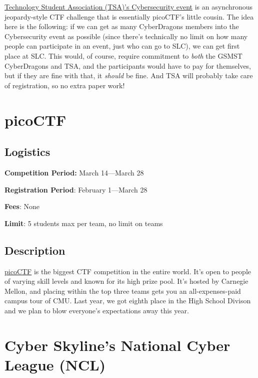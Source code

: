 \documentclass[
  letterpaper,
  DIV=11,
  numbers=noendperiod]{scrartcl}
\begin{document}
\href{https://docs.google.com/document/d/1q5fqitr-ezFVO6owV2g9lBzOqPFntbkny2nBKQRG9OU/edit?usp=sharing}{Technology
Student Association (TSA)'s Cybersecurity event} is an asynchronous
jeopardy-style CTF challenge that is essentially picoCTF's little
cousin. The idea here is the following: if we can get as many
CyberDragons members into the Cybersecurity event as possible (since
there's technically no limit on how many people can participate in an
event, just who can go to SLC), we can get first place at SLC. This
would, of course, require commitment to \emph{both} the GSMST
CyberDragons and TSA, and the participants would have to pay for
themselves, but if they are fine with that, it \emph{should} be fine.
And TSA will probably take care of registration, so no extra paper work!

\hypertarget{picoctf}{%
\section{picoCTF}\label{picoctf}}

\hypertarget{logistics-8}{%
\subsection{Logistics}\label{logistics-8}}

\textbf{Competition Period:} March 14---March 28

\textbf{Registration Period}: February 1---March 28

\textbf{Fees}: None

\textbf{Limit}: 5 students max per team, no limit on teams

\hypertarget{description-8}{%
\subsection{Description}\label{description-8}}

\href{https://picoctf.org/}{picoCTF} is the biggest CTF competition in
the entire world. It's open to people of varying skill levels and known
for its high prize pool. It's hosted by Carnegie Mellon, and placing
within the top three teams gets you an all-expenses-paid campus tour of
CMU. Last year, we got eighth place in the High School Divison and we
plan to blow everyone's expectations away this year.

\hypertarget{cyber-skylines-national-cyber-league-ncl}{%
\section{Cyber Skyline's National Cyber League
(NCL)}\label{cyber-skylines-national-cyber-league-ncl}}
\end{document}
